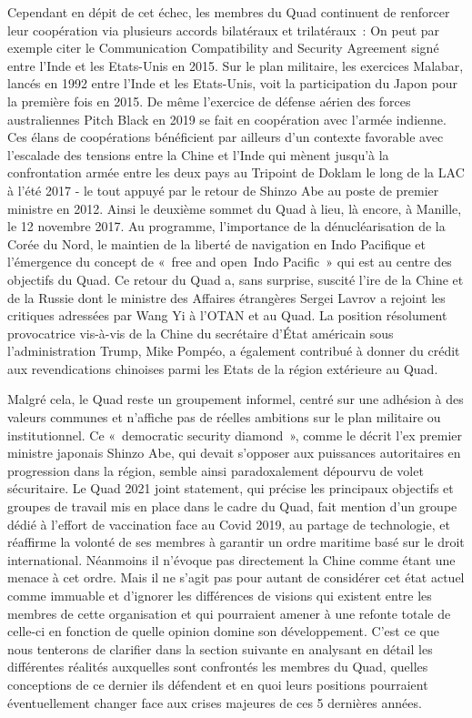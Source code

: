 \documentclass[11pt,a4paper]{article}
\begin{document}
Cependant en dépit de cet échec, les membres du Quad continuent de renforcer leur coopération via plusieurs accords bilatéraux et trilatéraux~: On peut par exemple citer le Communication Compatibility and Security Agreement signé entre l'Inde et les Etats-Unis en 2015. Sur le plan militaire, les exercices Malabar, lancés en 1992 entre l'Inde et les Etats-Unis, voit la participation du Japon pour la première fois en 2015. De même l'exercice de défense aérien des forces australiennes Pitch Black en 2019 se fait en coopération avec l'armée indienne. Ces élans de coopérations bénéficient par ailleurs d'un contexte favorable avec l'escalade des tensions entre la Chine et l'Inde qui mènent jusqu'à la confrontation armée entre les deux pays au Tripoint de Doklam le long de la LAC à l'été 2017 - le tout appuyé par le retour de Shinzo Abe au poste de premier ministre en 2012. Ainsi le deuxième sommet du Quad à lieu, là encore, à Manille, le 12 novembre 2017. Au programme, l'importance de la dénucléarisation de la Corée du Nord, le maintien de la liberté de navigation en Indo Pacifique et l'émergence du concept de «~free and open~Indo Pacific~» qui est au centre des objectifs du Quad. Ce retour du Quad a, sans surprise, suscité l'ire de la Chine et de la Russie dont le ministre des Affaires étrangères Sergei Lavrov a rejoint les critiques adressées par Wang Yi à l'OTAN et au Quad. La position résolument provocatrice vis-à-vis de la Chine du secrétaire d'État américain sous l'administration Trump, Mike Pompéo, a également contribué à donner du crédit aux revendications chinoises parmi les Etats de la région extérieure au Quad.

Malgré cela, le Quad reste un groupement informel, centré sur une adhésion à des valeurs communes et n'affiche pas de réelles ambitions sur le plan militaire ou institutionnel. Ce «~democratic security diamond~», comme le décrit l'ex premier ministre japonais Shinzo Abe, qui devait s'opposer aux puissances autoritaires en progression dans la région, semble ainsi paradoxalement dépourvu de volet sécuritaire. Le Quad 2021 joint statement, qui précise les principaux objectifs et groupes de travail mis en place dans le cadre du Quad, fait mention d'un groupe dédié à l'effort de vaccination face au Covid 2019, au partage de technologie, et réaffirme la volonté de ses membres à garantir un ordre maritime basé sur le droit international. Néanmoins il n'évoque pas directement la Chine comme étant une menace à cet ordre. Mais il ne s'agit pas pour autant de considérer cet état actuel comme immuable et d'ignorer les différences de visions qui existent entre les membres de cette organisation et qui pourraient amener à une refonte totale de celle-ci en fonction de quelle opinion domine son développement. C'est ce que nous tenterons de clarifier dans la section suivante en analysant en détail les différentes réalités auxquelles sont confrontés les membres du Quad, quelles conceptions de ce dernier ils défendent et en quoi leurs positions pourraient éventuellement changer face aux crises majeures de ces 5 dernières années.
\end{document}
